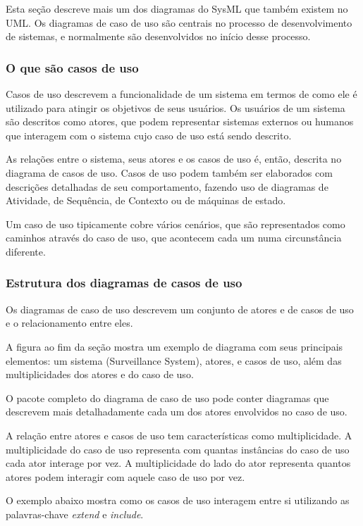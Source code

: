 Esta seção descreve mais um dos diagramas do SysML que também existem no UML. Os diagramas de caso de uso são centrais no processo de desenvolvimento de sistemas, e normalmente são desenvolvidos no início desse processo.

\subsubsection{O que são casos de uso}

Casos de uso descrevem a funcionalidade de um sistema em termos de como ele é utilizado para atingir os objetivos de seus usuários. Os usuários de um sistema são descritos como atores, que podem representar sistemas externos ou humanos que interagem com o sistema cujo caso de uso está sendo descrito.

As relações entre o sistema, seus atores e os casos de uso é, então, descrita no diagrama de casos de uso.
Casos de uso podem também ser elaborados com descrições detalhadas de seu comportamento, fazendo uso de diagramas de Atividade, de Sequência, de Contexto ou de máquinas de estado.

Um caso de uso tipicamente cobre vários cenários, que são representados como caminhos através do caso de uso, que acontecem cada um numa circunstância diferente.

\subsubsection{Estrutura dos diagramas de casos de uso}
Os diagramas de caso de uso descrevem um conjunto de atores e de casos de uso e o relacionamento entre eles.

A figura ao fim da seção mostra um exemplo de diagrama com seus principais elementos: um sistema (Surveillance System), atores, e casos de uso, além das multiplicidades dos atores e do caso de uso. 

O pacote completo do diagrama de caso de uso pode conter diagramas que descrevem mais detalhadamente cada um dos atores envolvidos no caso de uso.

A relação entre atores e casos de uso tem características como multiplicidade. A multiplicidade do caso de uso representa com quantas instâncias do caso de uso cada ator interage por vez. A multiplicidade do lado do ator representa quantos atores podem interagir com aquele caso de uso por vez.

O exemplo abaixo mostra como os casos de uso interagem entre si utilizando as palavras-chave \textit{extend} e \textit{include}.

